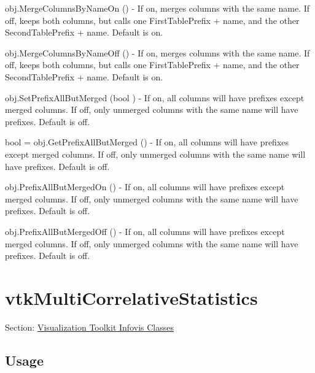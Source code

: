 \begin{DoxyItemize}
\item {\ttfamily obj.\-Merge\-Columns\-By\-Name\-On ()} -\/ If on, merges columns with the same name. If off, keeps both columns, but calls one First\-Table\-Prefix + name, and the other Second\-Table\-Prefix + name. Default is on.  
\item {\ttfamily obj.\-Merge\-Columns\-By\-Name\-Off ()} -\/ If on, merges columns with the same name. If off, keeps both columns, but calls one First\-Table\-Prefix + name, and the other Second\-Table\-Prefix + name. Default is on.  
\item {\ttfamily obj.\-Set\-Prefix\-All\-But\-Merged (bool )} -\/ If on, all columns will have prefixes except merged columns. If off, only unmerged columns with the same name will have prefixes. Default is off.  
\item {\ttfamily bool = obj.\-Get\-Prefix\-All\-But\-Merged ()} -\/ If on, all columns will have prefixes except merged columns. If off, only unmerged columns with the same name will have prefixes. Default is off.  
\item {\ttfamily obj.\-Prefix\-All\-But\-Merged\-On ()} -\/ If on, all columns will have prefixes except merged columns. If off, only unmerged columns with the same name will have prefixes. Default is off.  
\item {\ttfamily obj.\-Prefix\-All\-But\-Merged\-Off ()} -\/ If on, all columns will have prefixes except merged columns. If off, only unmerged columns with the same name will have prefixes. Default is off.  
\end{DoxyItemize}\hypertarget{vtkinfovis_vtkmulticorrelativestatistics}{}\section{vtk\-Multi\-Correlative\-Statistics}\label{vtkinfovis_vtkmulticorrelativestatistics}
Section\-: \hyperlink{sec_vtkinfovis}{Visualization Toolkit Infovis Classes} \hypertarget{vtkwidgets_vtkxyplotwidget_Usage}{}\subsection{Usage}\label{vtkwidgets_vtkxyplotwidget_Usage}
